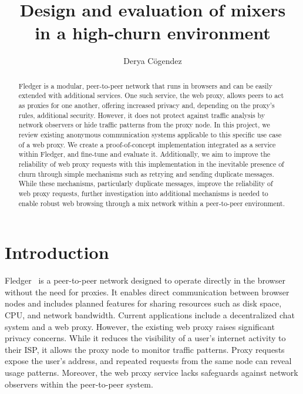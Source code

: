 \documentclass[a4paper,11pt,oneside]{report}
\title{Design and evaluation of mixers\\in a high-churn environment}
\author{Derya Cögendez}
\begin{document}
\maketitle
\makeacks

\begin{abstract} Fledger is a modular, peer-to-peer network that runs in browsers and can be easily extended with additional services. One such service, the web proxy, allows peers to act as proxies for one another, offering increased privacy and, depending on the proxy's rules, additional security. However, it does not protect against traffic analysis by network observers or hide traffic patterns from the proxy node. In this project, we review existing anonymous communication systems applicable to this specific use case of a web proxy. We create a proof-of-concept implementation integrated as a service within Fledger, and fine-tune and evaluate it. Additionally, we aim to improve the reliability of web proxy requests with this implementation in the inevitable presence of churn through simple mechanisms such as retrying and sending duplicate messages. While these mechanisms, particularly duplicate messages, improve the reliability of web proxy requests, further investigation into additional mechanisms is needed to enable robust web browsing through a mix network within a peer-to-peer environment.
\end{abstract}


\maketoc

\chapter{Introduction}

Fledger~\cite{fledger} is a peer-to-peer network designed to operate directly in the browser without the need for proxies. It enables direct communication between browser nodes and includes planned features for sharing resources such as disk space, CPU, and network bandwidth. Current applications include a decentralized chat system and a web proxy. However, the existing web proxy raises significant privacy concerns. While it reduces the visibility of a user's internet activity to their ISP, it allows the proxy node to monitor traffic patterns. Proxy requests expose the user's address, and repeated requests from the same node can reveal usage patterns. Moreover, the web proxy service lacks safeguards against network observers within the peer-to-peer system.
\end{document}
